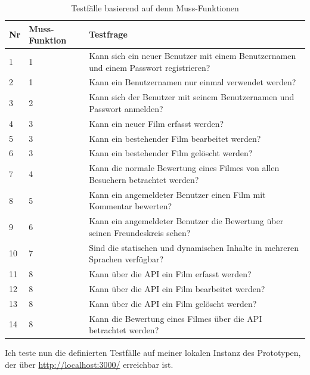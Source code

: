 \begin{table}[ht]
\begin{center}
    \begin{tabular}{llp{10cm}}
        \toprule Nr & Muss-Funktion & Testfrage \\
        \midrule 1 & 1 & Kann sich ein neuer Benutzer mit einem Benutzernamen und
                 einem Passwort registrieren? \\
        \midrule 2 & 1 & Kann ein Benutzernamen nur einmal verwendet werden? \\
        \midrule 3 & 2 & Kann sich der Benutzer mit seinem Benutzernamen und
                 Passwort anmelden? \\
        \midrule 4 & 3 & Kann ein neuer Film erfasst werden? \\
        \midrule 5 & 3 & Kann ein bestehender Film bearbeitet werden? \\
        \midrule 6 & 3 & Kann ein bestehender Film gelöscht werden? \\
        \midrule 7 & 4 & Kann die normale Bewertung eines Filmes von allen
                 Besuchern betrachtet werden? \\
        \midrule 8 & 5 & Kann ein angemeldeter Benutzer einen Film mit Kommentar
                 bewerten? \\
        \midrule 9 & 6 & Kann ein angemeldeter Benutzer die Bewertung über
                 seinen Freundeskreis sehen? \\
        \midrule 10 & 7 & Sind die statischen und dynamischen Inhalte in
                 mehreren Sprachen verfügbar? \\
        \midrule 11 & 8 & Kann über die API ein Film erfasst werden? \\
        \midrule 12 & 8 & Kann über die API ein Film bearbeitet werden? \\
        \midrule 13 & 8 & Kann über die API ein Film gelöscht werden? \\
        \midrule 14 & 8 & Kann die Bewertung eines Filmes über die API
                 betrachtet werden? \\
        \bottomrule
    \end{tabular}
    \caption{Testfälle basierend auf denn Muss-Funktionen}
    \label{tab:testfaelle}
\end{center}
\end{table}

\clearpage

Ich teste nun die definierten Testfälle auf meiner lokalen Instanz des 
Prototypen, der über \url{http://localhost:3000/} erreichbar ist.

